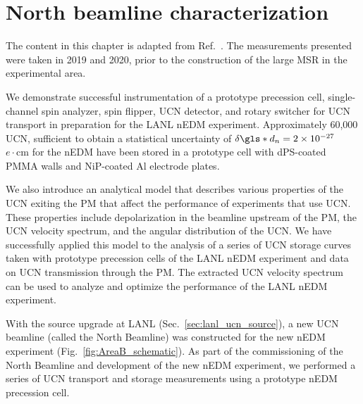 
\chapter{North beamline characterization}
\label{chap:north_beamline_paper}


The content in this chapter is adapted from Ref.~\cite{wong_north_beamline_2023}. The measurements presented were taken in 2019 and 2020, prior to the construction of the large MSR in the experimental area.

We demonstrate successful instrumentation of a prototype precession cell, single-channel spin analyzer, spin flipper, UCN detector, and rotary switcher for UCN transport in preparation for the LANL nEDM experiment. Approximately 60,000 UCN, sufficient to obtain a statistical uncertainty of $\delta \gls*{d_n} = 2\times 10^{-27}$~$e\cdot\text{cm}$ for the nEDM have been stored in a prototype cell with dPS-coated PMMA walls and NiP-coated Al electrode plates. 

We also introduce an analytical model that describes various properties of the UCN exiting the PM that affect the performance of experiments that use UCN. These properties include depolarization in the beamline upstream of the PM, the UCN velocity spectrum, and the angular distribution of the UCN. We have successfully applied this model to the analysis of a series of UCN storage curves taken with prototype precession cells of the LANL nEDM experiment and data on UCN transmission through the PM. The extracted UCN velocity spectrum can be used to analyze and optimize the performance of the LANL nEDM experiment. 

With the \ucn source upgrade at LANL (Sec.~\ref{sec:lanl_ucn_source}), a new UCN beamline (called the North Beamline) was constructed for the new nEDM experiment (Fig.~\ref{fig:AreaB_schematic}). As part of the commissioning of the North Beamline and development of the new nEDM experiment, we performed a series of UCN transport and storage measurements using a prototype nEDM precession cell. 

